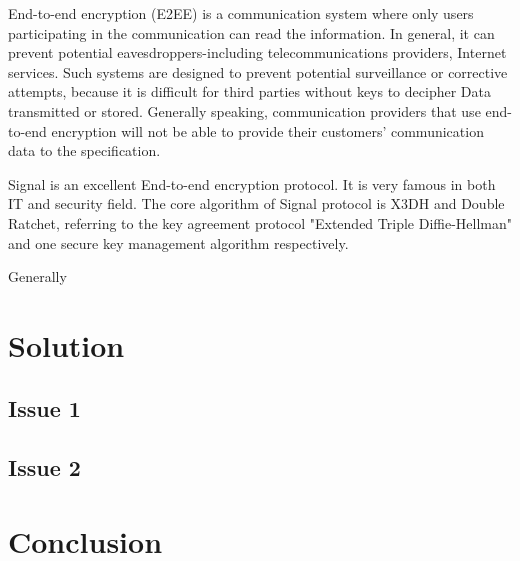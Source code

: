 \documentclass[11pt,en]{elegantpaper}
\begin{document}
End-to-end encryption (E2EE) is a communication system where only users participating in the communication can read the information. In general, it can prevent potential eavesdroppers-including telecommunications providers, Internet services. Such systems are designed to prevent potential surveillance or corrective attempts, because it is difficult for third parties without keys to decipher Data transmitted or stored. Generally speaking, communication providers that use end-to-end encryption will not be able to provide their customers' communication data to the specification. 

Signal is an excellent End-to-end encryption protocol.\cite{alwen2019double} It is very famous in both IT and security field. The core algorithm of Signal protocol is X3DH and Double Ratchet, referring to the key agreement protocol "Extended Triple Diffie-Hellman" and one secure key management algorithm respectively.

Generally






\section{Solution}



\subsection{Issue 1}



\subsection{Issue 2}

\section{Conclusion}




\end{document}
